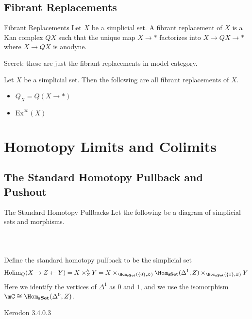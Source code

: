 \documentclass[a4paper]{article}
\begin{document}
\subsection{Fibrant Replacements}
\begin{defn}{Fibrant Replacements}{} Let $X$ be a simplicial set. A fibrant replacement of $X$ is a Kan complex $QX$ such that the unique map $X\to\ast$ factorizes into $X\to QX\to\ast$ where $X\to QX$ is anodyne. 
\end{defn}

Secret: these are just the fibrant replacements in model category. 

\begin{lmm}{}{} Let $X$ be a simplicial set. Then the following are all fibrant replacements of $X$. 
\begin{itemize}
\item $Q_X=Q(X\to\ast)$
\item $\text{Ex}^\infty(X)$
\end{itemize}
\end{lmm}


\pagebreak
\section{Homotopy Limits and Colimits}
\subsection{The Standard Homotopy Pullback and Pushout}
\begin{defn}{The Standard Homotopy Pullbacks}{} Let the following be a diagram of simplicial sets and morphisms. \\~\\
\\~\\
Define the standard homotopy pullback to be the simplicial set $$\text{Holim}_Q(X\rightarrow Z\leftarrow Y)=X\times_Z^hY=X\times_{\Hom_\bold{sSet}(\{0\},Z)}\Hom_\bold{sSet}(\Delta^1,Z)\times_{\Hom_\bold{sSet}(\{1\},Z)}Y$$ Here we identify the vertices of $\Delta^1$ as $0$ and $1$, and we use the isomorphism $\mC\cong\Hom_\bold{sSet}(\Delta^0,Z)$. 
\end{defn}

Kerodon 3.4.0.3
\end{document}
